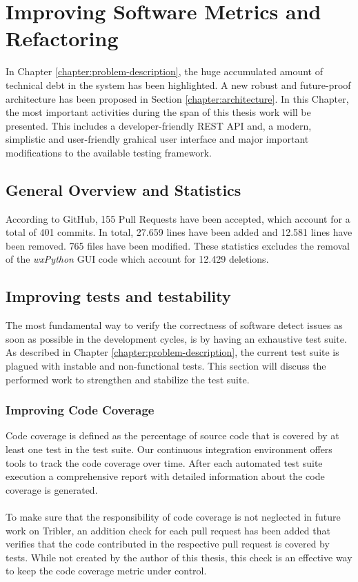 \label{chapter:refactoring}
\chapter{Improving Software Metrics and Refactoring}
In Chapter \ref{chapter:problem-description}, the huge accumulated amount of technical debt in the system has been highlighted. A new robust and future-proof architecture has been proposed in Section \ref{chapter:architecture}. In this Chapter, the most important activities during the span of this thesis work will be presented. This includes a developer-friendly REST API and, a modern, simplistic and user-friendly grahical user interface and major important modifications to the available testing framework.

\section{General Overview and Statistics}
According to GitHub, 155 Pull Requests have been accepted, which account for a total of 401 commits. In total, 27.659 lines have been added and 12.581 lines have been removed. 765 files have been modified. These statistics excludes the removal of the \emph{wxPython} GUI code which account for 12.429 deletions.

\section{Improving tests and testability}
The most fundamental way to verify the correctness of software detect issues as soon as possible in the development cycles, is by having an exhaustive test suite. As described in Chapter \ref{chapter:problem-description}, the current test suite is plagued with instable and non-functional tests. This section will discuss the performed work to strengthen and stabilize the test suite.

\subsection{Improving Code Coverage}
Code coverage is defined as the percentage of source code that is covered by at least one test in the test suite. Our continuous integration environment offers tools to track the code coverage over time. After each automated test suite execution a comprehensive report with detailed information about the code coverage is generated.\\\\
To make sure that the responsibility of code coverage is not neglected in future work on Tribler, an addition check for each pull request has been added that verifies that the code contributed in the respective pull request is covered by tests. While not created by the author of this thesis, this check is an effective way to keep the code coverage metric under control.

